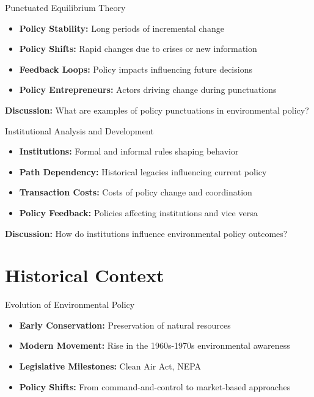 \documentclass[11pt, aspectratio=169]{beamer}
\begin{document}
\begin{frame}{Punctuated Equilibrium Theory}
    \begin{itemize}
        \item \textbf{Policy Stability:} Long periods of incremental change
        \item \textbf{Policy Shifts:} Rapid changes due to crises or new information
        \item \textbf{Feedback Loops:} Policy impacts influencing future decisions
        \item \textbf{Policy Entrepreneurs:} Actors driving change during punctuations
    \end{itemize}
    \pause
    \textbf{Discussion:} What are examples of policy punctuations in environmental policy?
\end{frame}

\begin{frame}{Institutional Analysis and Development}
    \begin{itemize}
        \item \textbf{Institutions:} Formal and informal rules shaping behavior
        \item \textbf{Path Dependency:} Historical legacies influencing current policy
        \item \textbf{Transaction Costs:} Costs of policy change and coordination
        \item \textbf{Policy Feedback:} Policies affecting institutions and vice versa
    \end{itemize}
    \pause
    \textbf{Discussion:} How do institutions influence environmental policy outcomes?
\end{frame}

\section{Historical Context}

\begin{frame}{Evolution of Environmental Policy}
    \begin{itemize}
        \item \textbf{Early Conservation:} Preservation of natural resources
        \item \textbf{Modern Movement:} Rise in the 1960s-1970s environmental awareness
        \item \textbf{Legislative Milestones:} Clean Air Act, NEPA
        \item \textbf{Policy Shifts:} From command-and-control to market-based approaches
    \end{itemize}
\end{frame}
\end{document}
